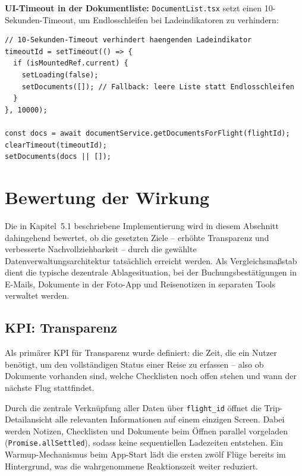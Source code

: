 \textbf{UI-Timeout in der Dokumentliste:}
\texttt{DocumentList.tsx} setzt einen 10-Sekunden-Timeout, um Endlosschleifen bei
Ladeindikatoren zu verhindern:

\begin{lstlisting}[style=skyline-ts,
  caption={Timeout-Fallback beim Laden der Dokumentliste
           (components/documents/DocumentList.tsx)},
  label={lst:timeout}]
// 10-Sekunden-Timeout verhindert haengenden Ladeindikator
timeoutId = setTimeout(() => {
  if (isMountedRef.current) {
    setLoading(false);
    setDocuments([]); // Fallback: leere Liste statt Endlosschleifen
  }
}, 10000);

const docs = await documentService.getDocumentsForFlight(flightId);
clearTimeout(timeoutId);
setDocuments(docs || []);
\end{lstlisting}

\section{Bewertung der Wirkung}

Die in Kapitel~5.1 beschriebene Implementierung wird in diesem Abschnitt dahingehend
bewertet, ob die gesetzten Ziele -- erhöhte Transparenz und verbesserte
Nachvollziehbarkeit -- durch die gewählte Datenverwaltungsarchitektur tatsächlich
erreicht werden.
Als Vergleichsmaßstab dient die typische dezentrale Ablagesituation, bei der
Buchungsbestätigungen in E-Mails, Dokumente in der Foto-App und Reisenotizen in
separaten Tools verwaltet werden.

\subsection{KPI: Transparenz}

Als primärer KPI für Transparenz wurde definiert: die Zeit, die ein Nutzer benötigt,
um den vollständigen Status einer Reise zu erfassen -- also ob Dokumente vorhanden sind,
welche Checklisten noch offen stehen und wann der nächste Flug stattfindet.

Durch die zentrale Verknüpfung aller Daten über \texttt{flight\_id} öffnet die
Trip-Detailansicht alle relevanten Informationen auf einem einzigen Screen.
Dabei werden Notizen, Checklisten und Dokumente beim Öffnen parallel vorgeladen
(\texttt{Promise.allSettled}), sodass keine sequentiellen Ladezeiten entstehen.
Ein Warmup-Mechanismus beim App-Start lädt die ersten zwölf Flüge bereits im
Hintergrund, was die wahrgenommene Reaktionszeit weiter reduziert.


